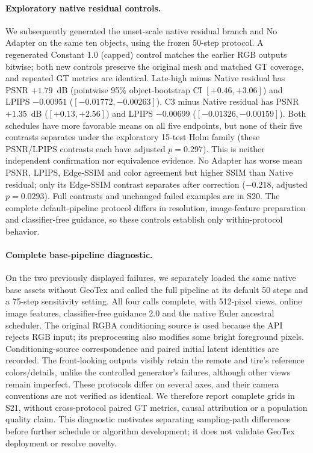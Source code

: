 \documentclass[times,twocolumn,final]{elsarticle}
\begin{document}
\paragraph{Exploratory native residual controls.}
We subsequently generated the unset-scale native residual branch and No Adapter on the same ten objects, using the frozen 50-step protocol. A regenerated Constant 1.0 (capped) control matches the earlier RGB outputs bitwise; both new controls preserve the original mesh and matched GT coverage, and repeated GT metrics are identical. Late-high minus Native residual has PSNR $+1.79$~dB (pointwise 95\% object-bootstrap CI $[+0.46,+3.06]$) and LPIPS $-0.00951$ ($[-0.01772,-0.00263]$). C3 minus Native residual has PSNR $+1.35$~dB ($[+0.13,+2.56]$) and LPIPS $-0.00699$ ($[-0.01326,-0.00159]$). Both schedules have more favorable means on all five endpoints, but none of their five contrasts separates under the exploratory 15-test Holm family (these PSNR/LPIPS contrasts each have adjusted $p=0.297$). This is neither independent confirmation nor equivalence evidence. No Adapter has worse mean PSNR, LPIPS, Edge-SSIM and color agreement but higher SSIM than Native residual; only its Edge-SSIM contrast separates after correction ($-0.218$, adjusted $p=0.0293$). Full contrasts and unchanged failed examples are in S20. The complete default-pipeline protocol differs in resolution, image-feature preparation and classifier-free guidance, so these controls establish only within-protocol behavior.

\paragraph{Complete base-pipeline diagnostic.}
On the two previously displayed failures, we separately loaded the same native base assets without GeoTex and called the full pipeline at its default 50 steps and a 75-step sensitivity setting. All four calls complete, with 512-pixel views, online image features, classifier-free guidance 2.0 and the native Euler ancestral scheduler. The original RGBA conditioning source is used because the API rejects RGB input; its preprocessing also modifies some bright foreground pixels. Conditioning-source correspondence and paired initial latent identities are recorded. The front-looking outputs visibly retain the remote and tire's reference colors/details, unlike the controlled generator's failures, although other views remain imperfect. These protocols differ on several axes, and their camera conventions are not verified as identical. We therefore report complete grids in S21, without cross-protocol paired GT metrics, causal attribution or a population quality claim. This diagnostic motivates separating sampling-path differences before further schedule or algorithm development; it does not validate GeoTex deployment or resolve novelty.
\end{document}
